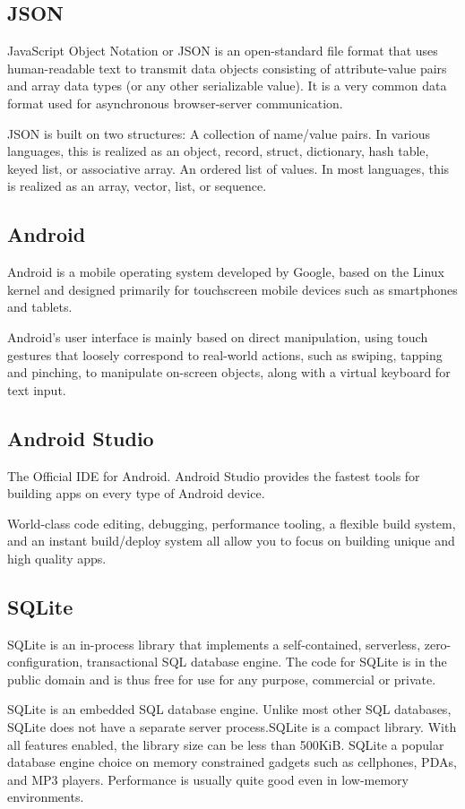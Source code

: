 \documentclass[BTech]{srmuthesis}
\begin{document}
\subsection{JSON}
JavaScript Object Notation or JSON is an open-standard file format that uses human-readable text to transmit data objects consisting of attribute-value pairs and array data types (or any other serializable value). It is a very common data format used for asynchronous browser-server communication.

JSON is built on two structures:
A collection of name/value pairs. In various languages, this is realized as an object, record, struct, dictionary, hash table, keyed list, or associative array.
An ordered list of values. In most languages, this is realized as an array, vector, list, or sequence.
\subsection{Android}
Android is a mobile operating system developed by Google, based on the Linux kernel and designed primarily for touchscreen mobile devices such as smartphones and tablets.

Android's user interface is mainly based on direct manipulation, using touch gestures that loosely correspond to real-world actions, such as swiping, tapping and pinching, to manipulate on-screen objects, along with a virtual keyboard for text input. 
\subsection{Android Studio}
The Official IDE for Android. Android Studio provides the fastest tools for building apps on every type of Android device.

World-class code editing, debugging, performance tooling, a flexible build system, and an instant build/deploy system all allow you to focus on building unique and high quality apps.
\subsection{SQLite}
SQLite is an in-process library that implements a self-contained, serverless, zero-configuration, transactional SQL database engine. The code for SQLite is in the public domain and is thus free for use for any purpose, commercial or private.

SQLite is an embedded SQL database engine. Unlike most other SQL databases, SQLite does not have a separate server process.SQLite is a compact library. With all features enabled, the library size can be less than 500KiB. SQLite a popular database engine choice on memory constrained gadgets such as cellphones, PDAs, and MP3 players. Performance is usually quite good even in low-memory environments.
\end{document}

